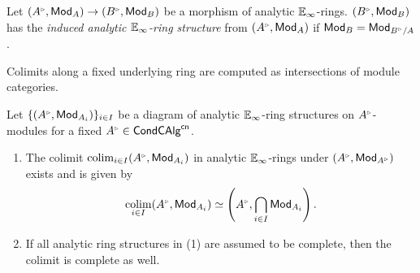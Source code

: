 \begin{definition}\label{def: induced analytic ring}
    Let $(A^{\tri},\Mod_{A})\to(B^{\tri},\Mod_{B})$ be a morphism of analytic $\mathbb{E}_{\infty}$-rings. $(B^{\tri},\Mod_{B})$ has the \emph{induced analytic $\mathbb{E}_{\infty}$-ring structure} from $(A^{\tri},\Mod_{A})$ if $\Mod_{B}=\Mod_{B^{\tri}/A}$. 
\end{definition}
Colimits along a fixed underlying ring are computed as intersections of module categories.
\begin{lemma}\label{lem: ringwise colimits}
    Let $\{(A^{\tri},\Mod_{A_{i}})\}_{i\in I}$ be a diagram of analytic $\mathbb{E}_{\infty}$-ring structures on $A^{\tri}$-modules for a fixed $A^{\tri}\in\Cond\CAlg^{\cn}$. 
    \begin{enumerate}
        \item The colimit $\colim_{i\in I}(A^{\tri},\Mod_{A_{i}})$ in analytic $\mathbb{E}_{\infty}$-rings under $(A^{\tri},\Mod_{A^{\tri}})$ exists and is given by 
        $$\colim_{i\in I}(A^{\tri},\Mod_{A_{i}})\simeq\left(A^{\tri},\bigcap_{i\in I}\Mod_{A_{i}}\right).$$
        \item If all analytic ring structures in (1) are assumed to be complete, then the colimit is complete as well. 
    \end{enumerate}
\end{lemma}
